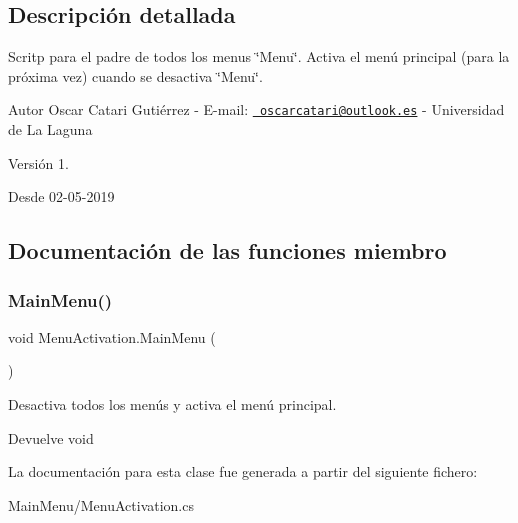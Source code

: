 \subsection{Descripción detallada}
Scritp para el padre de todos los menus \char`\"{}\+Menu\char`\"{}. Activa el menú principal (para la próxima vez) cuando se desactiva \char`\"{}\+Menu\char`\"{}. \begin{DoxyAuthor}{Autor}
Oscar Catari Gutiérrez -\/ E-\/mail\+: \href{mailto:oscarcatari@outlook.es}{\texttt{ oscarcatari@outlook.\+es}} -\/ Universidad de La Laguna 
\end{DoxyAuthor}
\begin{DoxyVersion}{Versión}
1. 
\end{DoxyVersion}
\begin{DoxySince}{Desde}
02-\/05-\/2019 
\end{DoxySince}


\subsection{Documentación de las funciones miembro}
\mbox{\label{class_menu_activation_a33c2996911d4edd216846a868c94ab72}} 
\subsubsection{\texorpdfstring{MainMenu()}{MainMenu()}}
{\footnotesize\ttfamily void Menu\+Activation.\+Main\+Menu (\begin{DoxyParamCaption}{ }\end{DoxyParamCaption})\hspace{0.3cm}{\ttfamily [inline]}}

Desactiva todos los menús y activa el menú principal. \begin{DoxyReturn}{Devuelve}
void 
\end{DoxyReturn}


La documentación para esta clase fue generada a partir del siguiente fichero\+:\begin{DoxyCompactItemize}
\item 
Main\+Menu/Menu\+Activation.\+cs\end{DoxyCompactItemize}
